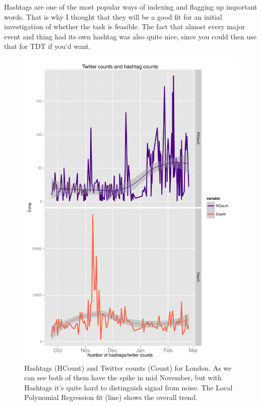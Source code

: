 \documentclass[minf,twoside,singlespacing,parskip,frontabs,notimes,11pt]{infthesis}
\begin{document}
Hashtags are one of the most popular ways of indexing and flagging up important words. That is why I thought that they will be a good fit for an initial investigation of whether the task is feasible. The fact that almost every major event and thing had its own hashtag was also quite nice, since you could then use that for TDT if you'd want.

\begin{figure}[]
\begin{center}
\includegraphics[scale=0.8]{hashtags-vs-counts}
\end{center}
\caption{Hashtags (HCount) and Twitter counts (Count) for London. As we can see both of them have the spike in mid November, but with Hashtags it's quite hard to distinguish signal from noise. The Local Polynomial Regression fit (line) shows the overall trend.}
\label{hashtag-count}
\end{figure}
\end{document}
